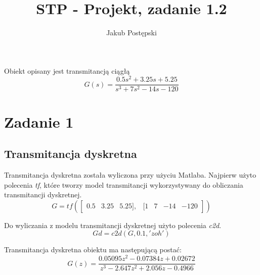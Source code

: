 \documentclass{article}
\author{Jakub Postępski}
\title{STP - Projekt, zadanie 1.2}
\begin{document}
\maketitle

Obiekt opisany jest transmitancją ciągłą
\[ G(s) = \frac{0.5s^2 +3.25s+5.25}{s^3 +7s^2 -14s-120} \]
\section{Zadanie 1}
\subsection{Transmitancja dyskretna}
Transmitancja dyskretna została wyliczona przy użyciu Matlaba.
Najpierw użyto polecenia \textit{tf}, które tworzy model transmitancji wykorzystywany do obliczania transmitancji dyskretnej. 
\[G = tf(\begin{bmatrix}0.5& 3.25& 5.25],&[1& 7& -14& -120\end{bmatrix})\]

Do wyliczania z modelu transmitancji dyskretnej użyto polecenia \textit{c2d}.
\[Gd = c2d(G,0.1,'zoh')\]

Transmitancja dyskretna obiektu ma następującą postać:
\[ G(z) = \frac{0.05095 z^2 - 0.07384 z + 0.02672}{z^3 - 2.647 z^2 + 2.056 z - 0.4966} \]
\end{document}
